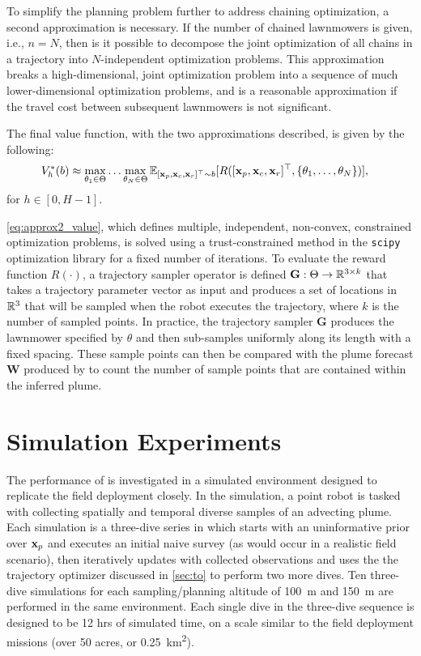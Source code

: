 To simplify the planning problem further to address chaining optimization, a second approximation is necessary. If the number of chained lawnmowers is given, i.e., $n=N$, then is it possible to decompose the joint optimization of all chains in a trajectory into $N$-independent optimization problems. This approximation breaks a high-dimensional, joint optimization problem into a sequence of much lower-dimensional optimization problems, and is a reasonable approximation if the travel cost between subsequent lawnmowers is not significant. 

The final \PHORTEX value function, with the two approximations described, is given by the following:
\begin{align}
     V_h^{*}(b) &\approx  \max_{\theta_1 \in \Theta} \dots \max_{\theta_N\in \Theta} \mathbb{E}_{[\mathbf{x}_{p}, \mathbf{x}_{c}, \mathbf{x}_{r}]^\top \sim b}[R([\mathbf{x}_{p}, \mathbf{x}_{c}, \mathbf{x}_{r}]^\top, \{\theta_1, \dots, \theta_N\})],
    \label{eq:approx2_value}
\end{align}
\noindent for $h \in [0, H-1]$.

\cref{eq:approx2_value}, which defines multiple, independent, non-convex, constrained optimization problems, is solved using a trust-constrained method in the \texttt{scipy} optimization library for a fixed number of iterations\autocite{conn2000trust}. To evaluate the reward function $R(\cdot)$, a trajectory sampler operator is defined $\mathbf{G}: \Theta \to \mathbb{R}^{3 \times k}$ that takes a trajectory parameter vector as input and produces a set of locations in $\mathbb{R}^3$ that will be sampled when the robot executes the trajectory, where $k$ is the number of sampled points. In practice, the trajectory sampler $\mathbf{G}$ produces the lawnmower specified by $\theta$ and then sub-samples uniformly along its length with a fixed spacing. These sample points can then be compared with the plume forecast $\mathbf{W}$ produced by \PHUMES to count the number of sample points that are contained within the inferred plume.


\section{Simulation Experiments}
\label{sec:experiments}
The performance of \PHORTEX is investigated in a simulated environment designed to replicate the field deployment closely. In the simulation, a point robot is tasked with collecting spatially and temporal diverse samples of an advecting plume. Each simulation is a three-dive series in which \PHORTEX starts with an uninformative prior over $\mathbf{x}_p$ and executes an initial naive survey (as would occur in a realistic field scenario), then iteratively updates \PHUMES with collected observations and uses the the trajectory optimizer discussed in \cref{sec:to} to perform two more dives. Ten three-dive simulations for each sampling/planning altitude of \SI{100}{\meter} and \SI{150}{\meter} are performed in the same environment. Each single dive in the three-dive sequence is designed to be 12 hrs of simulated time, on a scale similar to the field deployment missions (over 50 acres, or \SI{0.25}{\kilo\meter\squared}). 

